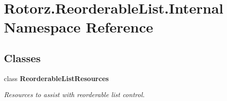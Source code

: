 \hypertarget{namespace_rotorz_1_1_reorderable_list_1_1_internal}{}\section{Rotorz.\+Reorderable\+List.\+Internal Namespace Reference}
\label{namespace_rotorz_1_1_reorderable_list_1_1_internal}
\subsection*{Classes}
\begin{DoxyCompactItemize}
\item 
class {\bfseries Reorderable\+List\+Resources}
\begin{DoxyCompactList}\small\item\em Resources to assist with reorderable list control. \end{DoxyCompactList}\end{DoxyCompactItemize}
